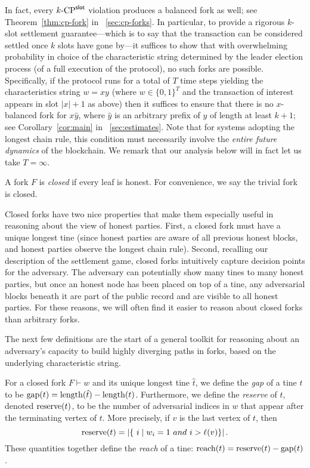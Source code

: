 In fact, every ${k}\text{-}\mathrm{CP}^{\mathsf{slot}}$ violation produces a balanced fork as well;
see Theorem~\ref{thm:cp-fork} in \Section~\ref{sec:cp-forks}.  In
particular, to provide a rigorous $k$-slot settlement
guarantee---which is to say that the transaction can be considered
settled once $k$ slots have gone by---it suffices to show that with
overwhelming probability in choice of the characteristic string
determined by the leader election process (of a full execution of the
protocol), no such forks are possible. Specifically, if the protocol
runs for a total of $T$ time steps yielding the characteristics string
$w = xy$ (where $w \in \{0,1\}^T$ and the transaction of interest
appears in slot $|x| + 1$ as above) then it suffices to ensure that
there is no $x$-balanced fork for $x\hat{y}$, where $\hat{y}$ is an
arbitrary prefix of $y$ of length at least $k + 1$; see
Corollary~\ref{cor:main} in \Section~\ref{sec:estimates}.  Note that
for systems adopting the longest chain rule, this condition must
necessarily involve the \emph{entire future dynamics} of the
blockchain. We remark that our analysis below will in fact let us take
$T = \infty$.

\begin{definition}
A fork $F$ is \emph{closed} if every leaf is honest. For convenience, we say the trivial fork is closed.
\end{definition}

Closed forks have two nice properties that make them especially useful in reasoning about the view of honest parties.
First, a closed fork must have a unique longest tine (since honest parties are aware of all previous honest blocks, and honest
parties observe the longest chain rule). Second, recalling our description of the
settlement game, closed forks intuitively capture decision points for the adversary.
The adversary can potentially show many tines to many honest parties, but once an honest node has been placed on top of 
a tine, any adversarial blocks beneath it are part of the public record and are visible to all honest parties. For these
reasons, we will often find it easier to reason about closed forks than arbitrary forks. %

The next few definitions are the start of a general toolkit for reasoning about an adversary's capacity to build highly diverging paths in forks, based on the underlying characteristic string.

\begin{definition}\label{def:gap-reserve-reach}
For a closed fork $F \vdash w$ and its unique longest tine $\hat{t}$, we define the \emph{gap} of a tine $t$ to be $\operatorname{gap}(t)=\operatorname{length}(\hat{t})-\operatorname{length}(t)$.
Furthermore, we define the \emph{reserve} of $t$, denoted $\operatorname{reserve}(t)$, to be the number of adversarial indices in $w$ that appear after the terminating vertex of $t$. More precisely, if $v$ is the last vertex of $t$, then
\[
  \reserve(t)=|\{\ i \mid w_i=1 \ and \ i > \ell(v)\}|\,.
  \]
These quantities together define the \emph{reach} of a tine: $
\operatorname{reach}(t)=\operatorname{reserve}(t)-\operatorname{gap}(t)$.
\end{definition}

